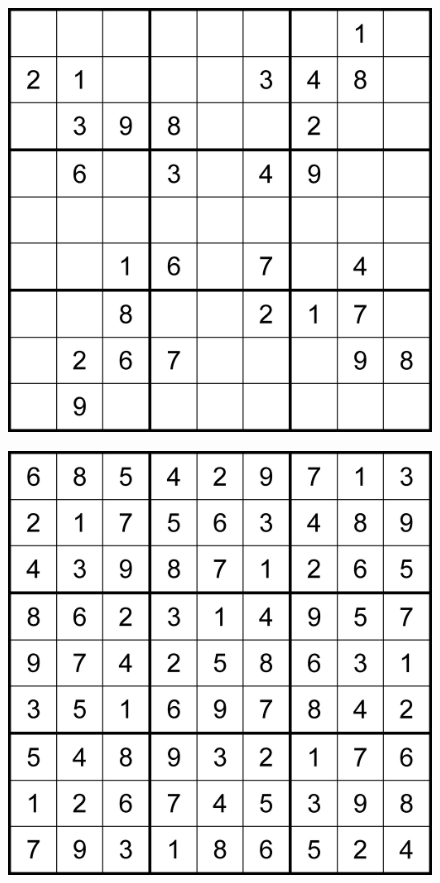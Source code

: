 \begin{figure}
\vspace{2.5mm}
\centering
\begin{minipage}{.4\textwidth}
    \centering
    \captionsetup{justification=centering,margin=0cm}
    \includegraphics[width=.8\textwidth]{Figures/SudokuManOfMystery.png}
    \label{fig:SudokuManOfMystery}
\end{minipage}%
\begin{minipage}{.4\textwidth}
  \centering
    \captionsetup{justification=centering,margin=0cm}
    \includegraphics[width=.8\textwidth]{Figures/SudokuManOfMysterySolution.png}
    \label{fig:SudokuManOfMysterySolution}
\end{minipage}
\end{figure}

